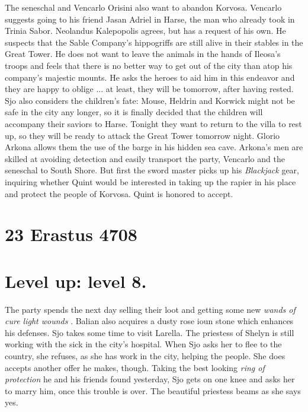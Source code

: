 The seneschal and Vencarlo Orisini also want to abandon Korvosa. Vencarlo suggests going to his friend Jasan Adriel in Harse, the man who already took in Trinia Sabor. Neolandus Kalepopolis agrees, but has a request of his own. He suspects that the Sable Company's hippogriffs are still alive in their stables in the Great Tower. He does not want to leave the animals in the hands of Ileosa's troops and feels that there is no better way to get out of the city than atop his company's majestic mounts. He asks the heroes to aid him in this endeavor and they are happy to oblige ... at least, they will be tomorrow, after having rested.\\

Sjo also considers the children's fate: Mouse, Heldrin and Korwick might not be safe in the city any longer, so it is finally decided that the children will accompany their saviors to Harse. Tonight they want to return to the villa to rest up, so they will be ready to attack the Great Tower tomorrow night. Glorio Arkona allows them the use of the barge in his hidden sea cave. Arkona's men are skilled at avoiding detection and easily transport the party, Vencarlo and the seneschal to South Shore. But first the sword master picks up his {\itshape Blackjack} gear, inquiring whether Quint would be interested in taking up the rapier in his place and protect the people of Korvosa. Quint is honored to accept. \section{23 Erastus 4708}

\section{Level up: level 8.}

The party spends the next day selling their loot and getting some new {\itshape wands of cure light wounds} . Balian also acquires a dusty rose ioun stone which enhances his defenses. Sjo takes some time to visit Larella. The priestess of Shelyn is still working with the sick in the city's hospital. When Sjo asks her to flee to the country, she refuses, as she has work in the city, helping the people. She does accepts another offer he makes, though. Taking the best looking {\itshape ring of protection} he and his friends found yesterday, Sjo gets on one knee and asks her to marry him, once this trouble is over. The beautiful priestess beams as she says yes. 